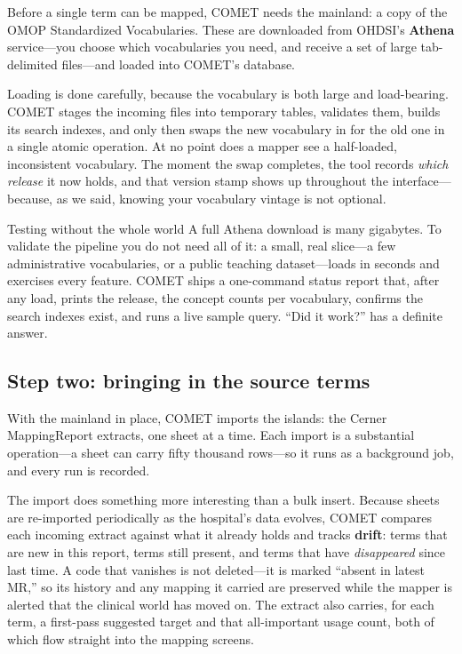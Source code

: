 \documentclass[12pt,openany]{book}
\begin{document}
Before a single term can be mapped, COMET needs the mainland: a copy of the OMOP Standardized
Vocabularies. These are downloaded from OHDSI's \textbf{Athena} service---you choose which vocabularies
you need, and receive a set of large tab-delimited files---and loaded into COMET's database.

Loading is done carefully, because the vocabulary is both large and load-bearing. COMET stages the
incoming files into temporary tables, validates them, builds its search indexes, and only then swaps
the new vocabulary in for the old one in a single atomic operation. At no point does a mapper see a
half-loaded, inconsistent vocabulary. The moment the swap completes, the tool records \emph{which
release} it now holds, and that version stamp shows up throughout the interface---because, as we said,
knowing your vocabulary vintage is not optional.

\begin{practice}{Testing without the whole world}
A full Athena download is many gigabytes. To validate the pipeline you do not need all of it: a small,
real slice---a few administrative vocabularies, or a public teaching dataset---loads in seconds and
exercises every feature. COMET ships a one-command status report that, after any load, prints the
release, the concept counts per vocabulary, confirms the search indexes exist, and runs a live sample
query. ``Did it work?'' has a definite answer.
\end{practice}

\subsection{Step two: bringing in the source terms}

With the mainland in place, COMET imports the islands: the Cerner MappingReport extracts, one sheet at
a time. Each import is a substantial operation---a sheet can carry fifty thousand rows---so it runs as
a background job, and every run is recorded.

The import does something more interesting than a bulk insert. Because sheets are re-imported
periodically as the hospital's data evolves, COMET compares each incoming extract against what it
already holds and tracks \textbf{drift}: terms that are new in this report, terms still present, and
terms that have \emph{disappeared} since last time. A code that vanishes is not deleted---it is marked
``absent in latest MR,'' so its history and any mapping it carried are preserved while the mapper is
alerted that the clinical world has moved on. The extract also carries, for each term, a first-pass
suggested target and that all-important usage count, both of which flow straight into the mapping
screens.
\end{document}
